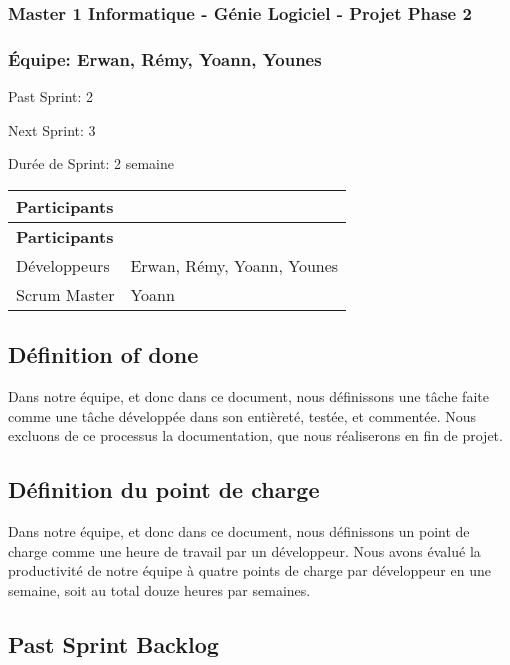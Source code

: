 \subsubsection*{Master 1 Informatique -\/ Génie Logiciel -\/ Projet Phase 2}

\subsubsection*{Équipe\+: Erwan, Rémy, Yoann, Younes}


\begin{DoxyItemize}
\item Past Sprint\+: 2
\item Next Sprint\+: 3
\item Durée de Sprint\+: 2 semaine
\end{DoxyItemize}

\tabulinesep=1mm
\begin{longtabu} spread 0pt [c]{*{2}{|X[-1]}|}
\hline
\rowcolor{\tableheadbgcolor}\textbf{ Participants }&\textbf{ }\\
\endfirsthead
\hline
\endfoot
\hline
\rowcolor{\tableheadbgcolor}\textbf{ Participants }&\textbf{ }\\
\endhead
Développeurs &Erwan, Rémy, Yoann, Younes \\
Scrum Master &Yoann \\
\end{longtabu}
\subsection*{Définition of done}

Dans notre équipe, et donc dans ce document, nous définissons une tâche faite comme une tâche développée dans son entièreté, testée, et commentée. Nous excluons de ce processus la documentation, que nous réaliserons en fin de projet.

\subsection*{Définition du point de charge}

Dans notre équipe, et donc dans ce document, nous définissons un point de charge comme une heure de travail par un développeur. Nous avons évalué la productivité de notre équipe à quatre points de charge par développeur en une semaine, soit au total douze heures par semaines.

\subsection*{Past Sprint Backlog}

